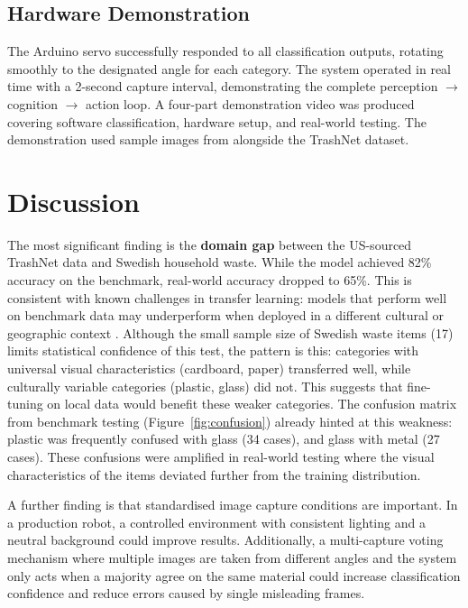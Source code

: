 \documentclass[11pt,a4paper]{article}
\begin{document}
\subsection{Hardware Demonstration}

The Arduino servo successfully responded to all classification outputs, rotating smoothly to the designated angle for each category. The system operated in real time with a 2-second capture interval, demonstrating the complete perception $\rightarrow$ cognition $\rightarrow$ action loop. A four-part demonstration video was produced covering software classification, hardware setup, and real-world testing. The demonstration used sample images from \citet{ozkefe2023waste} alongside the TrashNet dataset.

\section{Discussion}

The most significant finding is the \textbf{domain gap} between the US-sourced
TrashNet data and Swedish household waste. While the model achieved 82\% accuracy
on the benchmark, real-world accuracy dropped to 65\%. This is consistent with
known challenges in transfer learning: models that perform well on benchmark data
may underperform when deployed in a different cultural or geographic
context \citep{pan2010survey}. Although the small sample size of Swedish waste
items (17) limits statistical confidence of this test, the pattern is this: categories with
universal visual characteristics (cardboard, paper) transferred well, while
culturally variable categories (plastic, glass) did not. This suggests that fine-tuning on local data would benefit these weaker categories.
The confusion matrix from benchmark testing (Figure~\ref{fig:confusion}) already hinted at this weakness: plastic was frequently confused with glass (34 cases), and glass with metal (27 cases). These confusions were amplified in real-world testing where the visual characteristics of the items deviated further from the training distribution.

A further finding is that standardised image capture conditions are important.
In a production robot, a controlled environment with consistent lighting and
a neutral background could improve results. Additionally, a
multi-capture voting mechanism where multiple images are taken from
different angles and the system only acts when a majority agree on the same
material could increase classification confidence and reduce errors caused
by single misleading frames.
\end{document}
